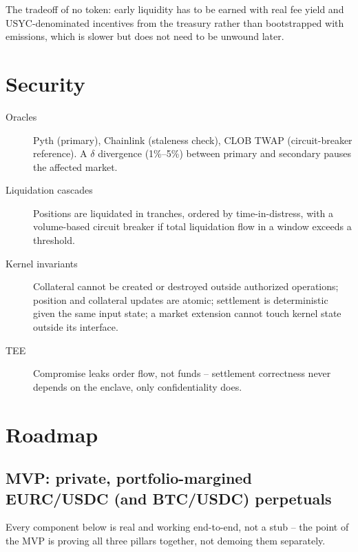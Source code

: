 \documentclass[11pt,a4paper]{article}
\begin{document}
The tradeoff of no token: early liquidity has to be earned with real fee yield and USYC-denominated incentives from the treasury rather than bootstrapped with emissions, which is slower but does not need to be unwound later.

\section{Security}
\label{sec:security}

\begin{description}
  \item[Oracles] Pyth (primary), Chainlink (staleness check), CLOB TWAP (circuit-breaker reference). A $\delta$ divergence (1\%--5\%) between primary and secondary pauses the affected market.
  \item[Liquidation cascades] Positions are liquidated in tranches, ordered by time-in-distress, with a volume-based circuit breaker if total liquidation flow in a window exceeds a threshold.
  \item[Kernel invariants] Collateral cannot be created or destroyed outside authorized operations; position and collateral updates are atomic; settlement is deterministic given the same input state; a market extension cannot touch kernel state outside its interface.
  \item[TEE] Compromise leaks order flow, not funds -- settlement correctness never depends on the enclave, only confidentiality does.
\end{description}

\section{Roadmap}
\label{sec:roadmap}

\subsection{MVP: private, portfolio-margined EURC/USDC (and BTC/USDC) perpetuals}

Every component below is real and working end-to-end, not a stub -- the point of the MVP is proving all three pillars together, not demoing them separately.
\end{document}
